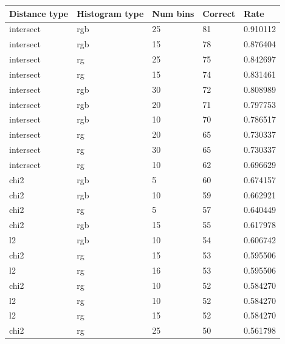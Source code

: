 \documentclass{article}
\begin{document}
\begin{longtable}{|l|l|l|l|l|}
    \hline
    \textbf{Distance type} & \textbf{Histogram type} & \textbf{Num bins} & \textbf{Correct} & \textbf{Rate}     \\ \hline
    intersect     & rgb            & 25       & 81      & 0.910112 \\ \hline
    intersect     & rgb            & 15       & 78      & 0.876404 \\ \hline
    intersect     & rg             & 25       & 75      & 0.842697 \\ \hline
    intersect     & rg             & 15       & 74      & 0.831461 \\ \hline
    intersect     & rgb            & 30       & 72      & 0.808989 \\ \hline
    intersect     & rgb            & 20       & 71      & 0.797753 \\ \hline
    intersect     & rgb            & 10       & 70      & 0.786517 \\ \hline
    intersect     & rg             & 20       & 65      & 0.730337 \\ \hline
    intersect     & rg             & 30       & 65      & 0.730337 \\ \hline
    intersect     & rg             & 10       & 62      & 0.696629 \\ \hline
    chi2          & rgb            & 5        & 60      & 0.674157 \\ \hline
    chi2          & rgb            & 10       & 59      & 0.662921 \\ \hline
    chi2          & rg             & 5        & 57      & 0.640449 \\ \hline
    chi2          & rgb            & 15       & 55      & 0.617978 \\ \hline
    l2            & rgb            & 10       & 54      & 0.606742 \\ \hline
    chi2          & rg             & 15       & 53      & 0.595506 \\ \hline
    l2            & rg             & 16       & 53      & 0.595506 \\ \hline
    chi2          & rg             & 10       & 52      & 0.584270 \\ \hline
    l2            & rg             & 10       & 52      & 0.584270 \\ \hline
    l2            & rg             & 15       & 52      & 0.584270 \\ \hline
    chi2          & rg             & 25       & 50      & 0.561798 \\ \hline

\end{longtable}
\end{document}
